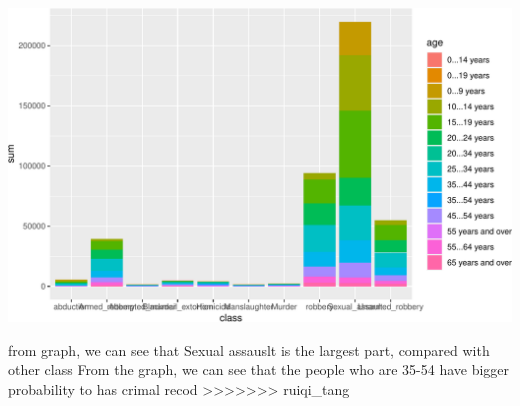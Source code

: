 \documentclass[11pt,a4paper,]{article}
\begin{document}
\begin{center}\includegraphics[width=0.5\linewidth]{report_files/figure-latex/graph-2} \end{center}

from graph, we can see that Sexual assauslt is the largest part, compared with other class
From the graph, we can see that the people who are 35-54 have bigger probability to has crimal recod
>>>>>>> ruiqi_tang

\printbibliography
\end{document}
